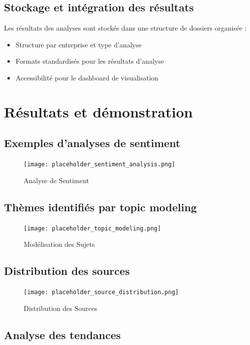 \documentclass[12pt,a4paper]{report}
\begin{document}
\section{Stockage et intégration des résultats}
Les résultats des analyses sont stockés dans une structure de dossiers organisée :
\begin{itemize}
    \item Structure par entreprise et type d'analyse
    \item Formats standardisés pour les résultats d'analyse
    \item Accessibilité pour le dashboard de visualisation
\end{itemize}

\chapter{Résultats et démonstration}

\section{Exemples d'analyses de sentiment}

\begin{figure}[h]
    \centering
    \texttt{[image: placeholder\_sentiment\_analysis.png]}
    \caption{Analyse de Sentiment}
\end{figure}

\section{Thèmes identifiés par topic modeling}

\begin{figure}[h]
    \centering
    \texttt{[image: placeholder\_topic\_modeling.png]}
    \caption{Modélisation des Sujets}
\end{figure}

\section{Distribution des sources}

\begin{figure}[h]
    \centering
    \texttt{[image: placeholder\_source\_distribution.png]}
    \caption{Distribution des Sources}
\end{figure}

\section{Analyse des tendances}
\end{document}
